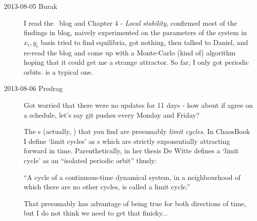 \begin{description}
\item[2013-08-05  Burak] I read the \twomode\ blog and
     {Chapter 4} -
    {\em Local stability}, confirmed most of the findings in blog,
    naively experimented on the parameters of the system in $x_i, y_i$
    basis tried to find equilibria, got nothing, then talked to Daniel,
    and re-read the blog and come up with a Monte-Carlo (kind of)
    algorithm hoping that it could get me a strange attractor. So far,
    I only got periodic orbits.  is a typical one.

\item[2013-08-06 Predrag]
Got worried that there were no updates for 11 days - how about if agree
on a schedule, let's say git pushes
\textcolor[rgb]{1.00,0.00,0.00}{every Monday and Friday}?

                                            \toCB
The \po s (actually, \reqva) that you find are presumably \emph{limit
cycles}. In ChaosBook I define `limit cycles' as \po s which are strictly
exponentially attracting forward in time. Parenthetically, in her thesis
De Witte defines a `limit cycle' as an ``isolated
periodic orbit'' thusly:

``A cycle of a continuous-time dynamical system, in a neighbourhood of
which there are no other cycles, is called a limit cycle.''

That presumably has advantage of being true for both directions of time,
but I do not think we need to get that finicky...



\end{description}
